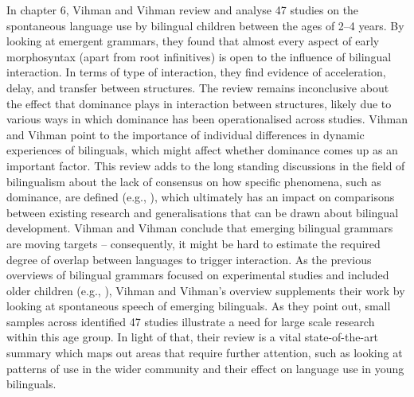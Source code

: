 \documentclass[output=paper]{langscibook}
\begin{document}
In chapter 6, Vihman and Vihman review and analyse 47 studies on the spontaneous language use by bilingual children between the ages of 2--4 years. By looking at emergent grammars, they found that almost every aspect of early morphosyntax (apart from root infinitives) is open to the influence of bilingual interaction. In terms of type of interaction, they find evidence of acceleration, delay, and transfer between structures. The review remains inconclusive about the effect that dominance plays in interaction between structures, likely due to various ways in which dominance has been operationalised across studies. Vihman and Vihman point to the importance of individual differences in dynamic experiences of bilinguals, which might affect whether dominance comes up as an important factor. This review adds to the long standing discussions in the field of bilingualism about the lack of consensus on how specific phenomena, such as dominance, are defined (e.g., \citealt{Treffers-Daller2019}), which ultimately has an impact on comparisons between existing research and generalisations that can be drawn about bilingual development. Vihman and Vihman conclude that emerging bilingual grammars are moving targets -- consequently, it might be hard to estimate the required degree of overlap between languages to trigger interaction. As the previous overviews of bilingual grammars focused on experimental studies and included older children (e.g.,  \citealt{VanDijkEtAl2022}), Vihman and Vihman’s overview supplements their work by looking at spontaneous speech of emerging bilinguals. As they point out, small samples across identified 47 studies illustrate a need for large scale research within this age group. In light of that, their review is a vital state-of-the-art summary which maps out areas that require further attention, such as looking at patterns of use in the wider community and their effect on language use in young bilinguals.
\end{document}
